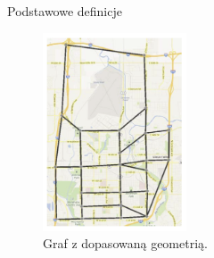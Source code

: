 \documentclass{beamer}
\begin{document}
\begin{frame}{Podstawowe definicje} 
	\begin{figure}[h!]
	\includegraphics[width=0.38\textwidth]{img/dopasowanie}
	\caption{Graf z dopasowaną geometrią.}
	\end{figure}
\end{frame}
\end{document}
